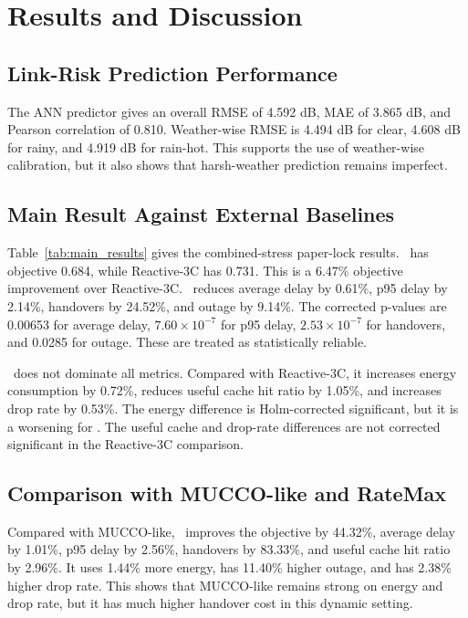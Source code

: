 \section{Results and Discussion}
\subsection{Link-Risk Prediction Performance}
The ANN predictor gives an overall RMSE of 4.592 dB, MAE of 3.865 dB, and Pearson correlation of 0.810. Weather-wise RMSE is 4.494 dB for clear, 4.608 dB for rainy, and 4.919 dB for rain-hot. This supports the use of weather-wise calibration, but it also shows that harsh-weather prediction remains imperfect.

\subsection{Main Result Against External Baselines}
Table~\ref{tab:main_results} gives the combined-stress paper-lock results. \pclr\ has objective 0.684, while Reactive-3C has 0.731. This is a 6.47\% objective improvement over Reactive-3C. \pclr\ reduces average delay by 0.61\%, p95 delay by 2.14\%, handovers by 24.52\%, and outage by 9.14\%. The corrected p-values are 0.00653 for average delay, $7.60\times10^{-7}$ for p95 delay, $2.53\times10^{-7}$ for handovers, and 0.0285 for outage. These are treated as statistically reliable.

\pclr\ does not dominate all metrics. Compared with Reactive-3C, it increases energy consumption by 0.72\%, reduces useful cache hit ratio by 1.05\%, and increases drop rate by 0.53\%. The energy difference is Holm-corrected significant, but it is a worsening for \pclr. The useful cache and drop-rate differences are not corrected significant in the Reactive-3C comparison.




\subsection{Comparison with MUCCO-like and RateMax}
Compared with MUCCO-like, \pclr\ improves the objective by 44.32\%, average delay by 1.01\%, p95 delay by 2.56\%, handovers by 83.33\%, and useful cache hit ratio by 2.96\%. It uses 1.44\% more energy, has 11.40\% higher outage, and has 2.38\% higher drop rate. This shows that MUCCO-like remains strong on energy and drop rate, but it has much higher handover cost in this dynamic setting.

